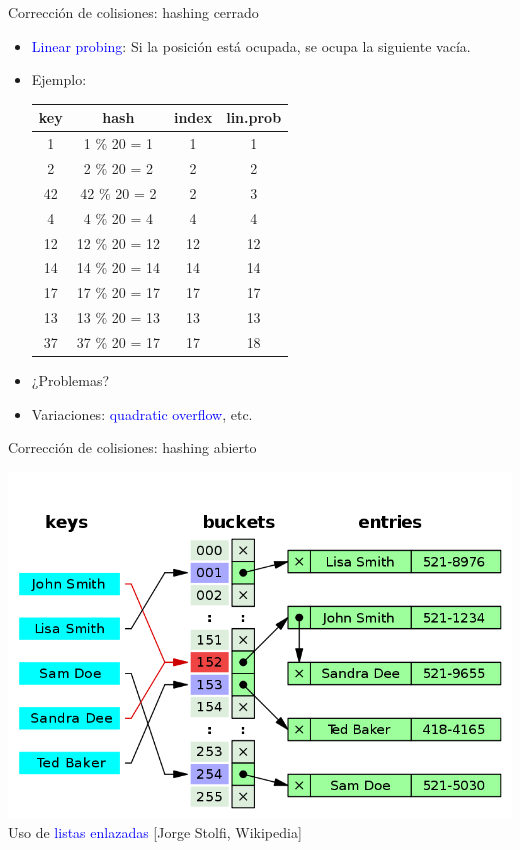 \documentclass[handout]{beamer} %
\newcommand{\blue}[1]{\textcolor{blue}{#1}}
\begin{document}
\begin{frame}{Corrección de colisiones: hashing cerrado}
    \begin{itemize}
        \item<1-> \blue{Linear probing}: Si la posición está ocupada, se ocupa la siguiente vacía.
        \item<2-> Ejemplo:\\
        \begin{tabular}{cccc}
        key & hash & index & lin.prob\\\hline
1	& 1 \% 20 = 1	& 1	& 1 \\
2	& 2 \% 20 = 2	& 2	& 2 \\
42	& \hspace{-2ex} 42 \% 20 = 2	& 2	& 3 \\
4	& 4 \% 20 = 4	& 4	& 4 \\
12	& 12 \% 20 = 12	& 12 & 12 \\
14	& 14 \% 20 = 14	& 14 & 14 \\
17	& 17 \% 20 = 17	& 17 & 17 \\
13	& 13 \% 20 = 13	& 13 & 13 \\
37	& 37 \% 20 = 17	& 17 & 18 \\
        \end{tabular}
        \item<3-> ¿Problemas? 
        \item<5-> Variaciones: \blue{quadratic overflow}, etc.
    \end{itemize}
\end{frame}

\begin{frame}{Corrección de colisiones: hashing abierto}
    \begin{center}
        \includegraphics[width=.9\textwidth]{./image/cap4/hash-table-list.png}\\
        Uso de \blue{listas enlazadas} \hspace{15ex} {\tiny [Jorge Stolfi, Wikipedia]}
    \end{center}
\end{frame}
\end{document}
